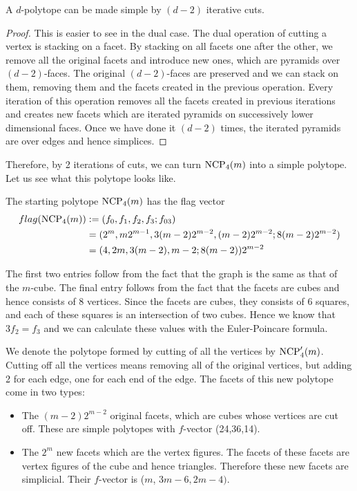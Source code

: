 \begin{lemma}
 A $d$-polytope can be made simple by $(d-2)$ iterative cuts.
\end{lemma}

\begin{proof}
This is easier to see in the dual case. The dual operation of cutting a vertex 
is stacking on a facet. By stacking on all facets one after the other, we 
remove all the original facets and introduce new ones, which are pyramids over 
$(d-2)$-faces. The original $(d-2)$-faces are preserved and we can stack on 
them, removing them and the facets created in the previous operation. Every 
iteration of this operation removes all the facets created in previous 
iterations and creates new facets which are iterated pyramids on successively 
lower dimensional faces. Once we have done it $(d-2)$ times, the iterated 
pyramids are over edges and hence simplices.  
\end{proof}

Therefore, by 2 iterations of cuts, we can turn $\textrm{NCP}_4(m)$ into a simple 
polytope. Let us see what this polytope looks like. 

The starting polytope $\textrm{NCP}_4(m)$ has the flag vector 
\begin{align}
 flag(\textrm{NCP}_4(m)) &:= (f_0, f_1, f_2, f_3; f_{03}) \\
	&= (2^m, m2^{m-1}, 3(m-2)2^{m-2}, (m-2)2^{m-2}; 8(m-2)2^{m-2}) \\
	&= (4, 2m, 3(m-2), m-2; 8(m-2))2^{m-2}
\end{align}

The first two entries follow from the fact that the graph is the same as that 
of the $m$-cube. The final entry follows from the fact that the facets are 
cubes and hence consists of 8 vertices. Since the facets are cubes, they 
consists of 6 squares, and each of these squares is an intersection of two 
cubes. Hence we know that $3f_2 = f_3$ and we can calculate these values with 
the Euler-Poincare formula.

We denote the polytope formed by cutting of all the vertices by $\textrm{NCP}'_4(m)$.
Cutting off all the vertices means removing all of the original vertices, but 
adding 2 for each edge, one for each end of the edge. The facets of this new 
polytope come in two types:

\begin{itemize}
 \item The $(m-2)2^{m-2}$ original facets, which are cubes whose vertices are 
cut off. These are simple polytopes with $f$-vector (24,36,14).
 \item The $2^m$ new facets which are the vertex figures. The facets of these 
facets are vertex figures of the cube and hence triangles. Therefore these 
new facets are simplicial. Their $f$-vector is ($m$, 
$3m-6, 2m-4)$.
\end{itemize}


